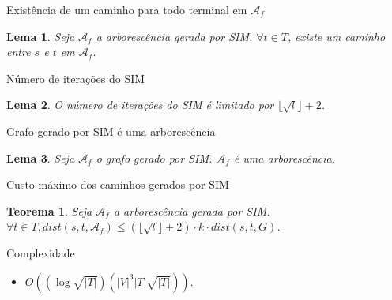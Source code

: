 \documentclass[10pt]{beamer}
\newtheorem{lema}{Lema}
\newtheorem{teorema}[theorem]{Teorema}
\begin{document}
\begin{frame}{Existência de um caminho para todo terminal em $\mathcal{A}_f$}
  \begin{lema}
    \label{lem:terminals_covered}
    Seja $\mathcal{A}_f$ a arborescência gerada por SIM. $\forall t \in T$, existe um caminho entre $s$ e $t$ em $\mathcal{A}_f$.
  \end{lema}
\hypertarget{terminals_covered}{}
\hyperlink{terminals_covered_slide}{}
\end{frame}

\begin{frame}{Número de iterações do SIM}
  \begin{lema}
    \label{lem:number_iterations}
    O número de iterações do SIM é limitado por $\lfloor\sqrt{l}\rfloor + 2$.
  \end{lema}
\hypertarget{number_iterations}{}
\hyperlink{number_iterations_slide}{}
\end{frame}

\begin{frame}{Grafo gerado por SIM é uma arborescência}
  \begin{lema}
    \label{lem:sim_output_arborescence}
    Seja $\mathcal{A}_f$ o grafo gerado por SIM. $\mathcal{A}_f$ é uma arborescência.
  \end{lema}
\hypertarget{sim_output_arborescence}{}
\hyperlink{sim_output_arborescence_slide}{}
\end{frame}

\begin{frame}{Custo máximo dos caminhos gerados por SIM}
  \begin{teorema}
    \label{teo:cost}
    Seja $\mathcal{A}_f$ a arborescência gerada por SIM. $\forall t \in T, dist(s,t,\mathcal{A}_f) \leq (\lfloor\sqrt{l}\rfloor+2) \cdot k \cdot dist(s,t,G)$.
  \end{teorema}
\hypertarget{cost}{}
\hyperlink{cost_slide}{}
\end{frame}

\begin{frame}{Complexidade}
\begin{itemize}
  \item $O((\log \sqrt{|T|})(|V|^3|T| \sqrt{|T|}))$.
\end{itemize}
\hypertarget{comp_sim}{}
\hyperlink{comp_sim_slide}{}
\end{frame}
\end{document}
